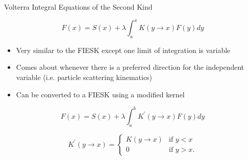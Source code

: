 \documentclass{beamer}
\begin{document}
\begin{frame}{Volterra Integral Equations of the Second Kind}

  \begin{equation*}
    F(x) = S(x) + \lambda \int_a^x K(y \to x) F(y) dy
  \end{equation*}

  \bigskip
  
  \begin{itemize}
    \item Very similar to the FIESK except one limit of integration is variable
      \medskip
    \item Comes about whenever there is a preferred direction for the 
      independent variable (i.e. particle scattering kinematics)
      \medskip
    \item Can be converted to a FIESK using a modified kernel
  \end{itemize}

  \begin{equation*}
    F(x) = S(x) + \lambda \int_a^b K^{'}(y \to x) F(y) dy \nonumber
  \end{equation*}
  
  \begin{equation*}
    K^{'}(y \to x) = 
    \begin{cases}
      K(y \to x) & \text{if }y < x \\
      0 & \text{if }y > x.
    \end{cases}
  \end{equation*}

\end{frame}



  
\end{document}
